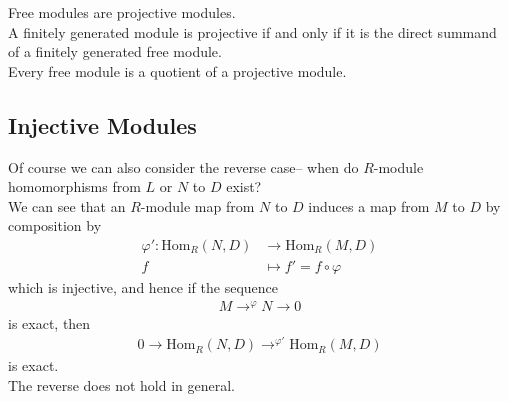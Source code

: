 \documentclass{memoir}
\begin{document}
\begin{cor}
	Free modules are projective modules.\\

	A finitely generated module is projective if and only if it is the direct summand of a finitely generated free module.\\

	Every free module is a quotient of a projective module.
\end{cor}

\begin{exmp}
	
\end{exmp}


\subsection{Injective Modules}
\label{sub:injective_modules}

Of course we can also consider the reverse case-- when do \(R\)-module homomorphisms from \(L\) or \(N\) to \(D\) exist?\\

We can see that an \(R\)-module map from \(N\) to \(D\) induces a map from \(M\) to \(D\) by composition by
\begin{align*}
	\varphi' : \textrm{Hom}_R(N,D) &\to \textrm{Hom}_R(M,D)\\
	f &\mapsto f' = f \circ \varphi 
\end{align*}
which is injective, and hence if the sequence
\begin{align*}
	M\to^{\varphi }N \to 0
\end{align*} is exact, then
\begin{align*}
	0 \to \textrm{Hom}_R(N,D) \to^{\varphi '} \textrm{Hom}_R(M,D)
\end{align*} is exact.\\

The reverse does not hold in general.

\begin{exmp}
	
\end{exmp}
\end{document}

